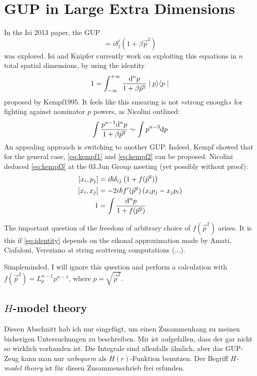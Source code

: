 \documentclass[10pt,a4paper, fleqn]{article}
\begin{document}
\section{GUP in Large Extra Dimensions}
In the Isi 2013 paper, the GUP
\begin{equation}
[x^i, p_j] = i \delta^i_j (1 + \beta \vec p^2)
\end{equation}
was explored. Isi and Knipfer currently work on exploiting this equations in $n$ total spatial dimensions, by using the identity
\begin{equation}
1 = \int_{-\infty}^{+\infty} \frac{\mathrm{d}^n p}{1 + \beta \vec p^2} \mid p \rangle \langle p \mid
\label{eq:identity}
\end{equation}
proposed by Kempf1995. It feels like this smearing is not »strong enough« for fighting against nominator $p$ powers, as Nicolini outlined:
\begin{equation}
\int \frac{p^{n-1} \mathrm{d}^n p}{1 + \beta \vec p^2}
\sim
\int p^ {n-3} \mathrm{d} p
\end{equation}
An appealing approach is switching to another GUP. Indeed, Kempf showed that for the general case, \eqref{eq:kempf1} and \eqref{eq:kempf2} can be proposed. Nicolini deduced \eqref{eq:kempf3} at the 03.Jun Group meeting (yet possibly without proof):
\begin{subequations}
\begin{align}
\label{eq:kempf1}
[x_i, p_j] &= i\hbar\delta_{ij} \left(1 + f(\vec p^2) \right) \\
\label{eq:kempf2}
[x_i, x_j] &= -2 i \hbar f'(\vec p^2) \left( x_i p_j - x_j p_i \right) \\
\label{eq:kempf3}
1 &= \int \frac{\mathrm{d}^n p}{1 + f(\vec p^2)}
\end{align}
\end{subequations}

The important question of the freedom of arbitrary choice of $f(\vec p^2)$ arises. It is this if \eqref{eq:identity} depends on the eikonal approximation made by Amati, Ciafaloni, Vereziano at string scattering computations (...).

Simpleminded, I will ignore this question and perform a calculation with $f(\vec p^2) = L_p^{n-1} p^{n-1}$, where $p=\sqrt{\vec p^2}$.

\subsection{$H$-model theory}
\begin{todo}
Diesen Abschnitt hab ich nur eingefügt, um einen Zusammenhang zu
meinen bisherigen Untersuchungen zu beschreiben. Mir ist aufgefallen,
dass der gar nicht so wirklich vorhanden ist. Die Integrale sind
allenfalls ähnlich, aber das GUP-Zeug kann man nur {\it unbequem}
als $H(r)$-Funktion benutzen. Der Begriff {\it $H$-model theory}
ist für diesen Zusammenschrieb frei erfunden.
\end{todo}
\end{document}
